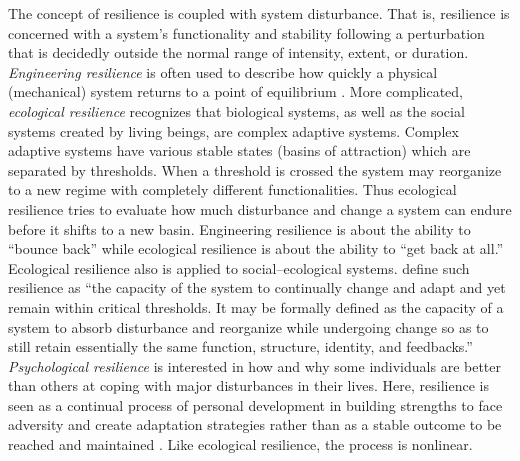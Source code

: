\documentclass[11pt,fleqn]{book} %
\begin{document}
\noindent The concept of resilience is coupled with system disturbance. That is, resilience is concerned with a system's functionality and stability following a perturbation that is decidedly outside the normal range of intensity, extent, or duration. \textit{Engineering resilience} is often used to describe how quickly a physical (mechanical) system returns to a point of equilibrium \autocite{walker_resilience_2006}. More complicated, \textit{ecological resilience} recognizes that biological systems, as well as the social systems created by living beings, are complex adaptive systems. Complex adaptive systems have various stable states (basins of attraction) which are separated by thresholds. When a threshold is crossed the system may reorganize to a new regime with completely different functionalities. Thus ecological resilience tries to evaluate how much disturbance and change a system can endure before it shifts to a new basin. Engineering resilience is about the ability to \enquote {bounce back} while ecological resilience is about the ability to \enquote {get back at all.} Ecological resilience also is applied to social–ecological systems. \textcite {berkes_community_2013} define such resilience as \enquote{the capacity of the system to continually change and adapt and yet remain within critical thresholds. It may be formally defined as the capacity of a system to absorb disturbance and reorganize while undergoing change so as to still retain essentially the same function, structure, identity, and feedbacks.} \textit{Psychological resilience} is interested in how and why some individuals are better than others at coping with major disturbances in their lives. Here, resilience is seen as a continual process of personal development in building strengths to face adversity and create adaptation strategies rather than as a stable outcome to be reached and maintained \autocite{berkes_community_2013}. Like ecological resilience, the process is nonlinear.\\
\end{document}

